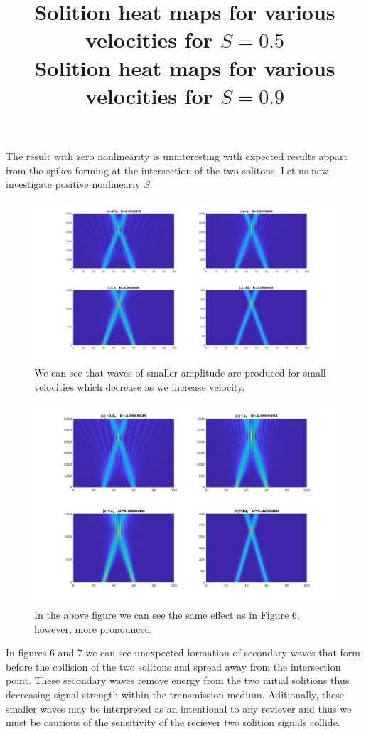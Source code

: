 \documentclass{article}
\begin{document}
\begin{enumerate}
The result with zero nonlinearity is uninteresting with expected results appart from the spikes forming at the intersection of the two solitons. Let us now investigate positive nonlineariy $S$. 
\begin{figure}[htp]
\title{Solition heat maps for various velocities for $S=0.5$\\}
\includegraphics[scale=0.35,center]{3D_V_S05.jpg}
\caption{We can see that waves of smaller amplitude are produced for small velocities which decrease as we increase velocity.}
\end{figure}
\begin{figure}[htp]
\title{Solition heat maps for various velocities for $S=0.9$\\}
\includegraphics[scale=0.5,center]{3D_V_S09.jpg}
\caption{In the above figure we can see the same effect as in Figure 6, however, more pronounced}
\end{figure}
In figures 6 and 7 we can see unexpected formation of secondary waves that form before the collision of the two solitons and spread away from the intersection point. These secondary waves remove energy from the two initial solitions thus decreasing signal strength within the transmission medium. Aditionally, these smaller waves may be interpreted as an intentional to any reviever and thus we must be cautious of the sensitivity of the reciever two solition signals collide. \\

\end{enumerate}
\end{document}
